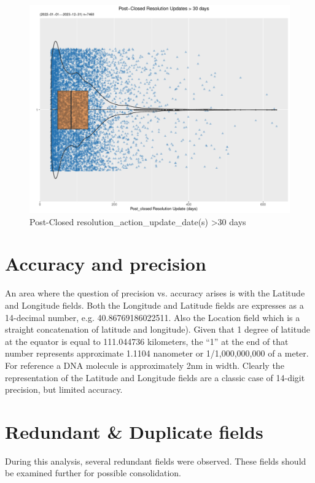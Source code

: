 \documentclass[12pt, titlepage]{article}
\begin{document}
\begin{figure}[tbp]
	\centering
	\includegraphics[width = \textwidth]{post_closed_violin.pdf}
	\caption{Post-Closed resolution\_action\_update\_date(s) 
	\textgreater30 days}
	\label{fig:resolution-violin}
\end{figure}		


	
\section{Accuracy and precision}
\label{sec:precision}
An area where the question of precision vs. accuracy arises is
with the Latitude and Longitude fields. Both the Longitude and 
Latitude fields are expresses as a 14-decimal 
number, e.g. 40.86769186022511. Also the Location field which is a 
straight concatenation of latitude and longitude). Given that 1 
degree of latitude at the equator is equal to 111.044736 kilometers, 
the ``1'' at the end of that number represents approximate 1.1104 nanometer 
or 1/1,000,000,000 of a meter. For reference a DNA molecule is 
approximately 2nm in width. Clearly the representation of 
the Latitude and Longitude fields are a classic case of 14-digit 
precision, but limited accuracy. 



\section{Redundant \& Duplicate fields}\label{sec:duplicates}
During this analysis, several redundant fields were observed. These 
fields should be examined further for possible consolidation.
\end{document}

